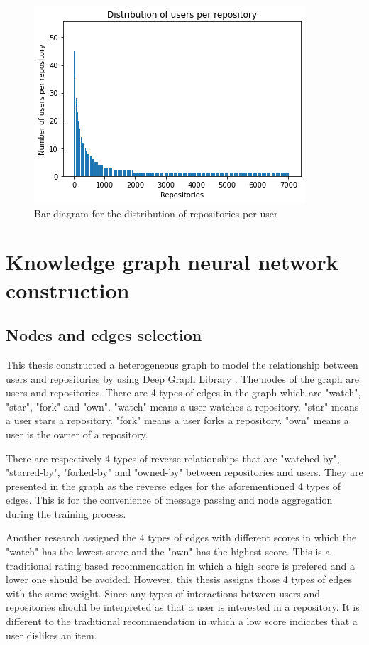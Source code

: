 \documentclass[11pt,twoside]{report}
\begin{document}
\begin{figure}[H]
    \centering
    \includegraphics[scale=0.9]{user_repo_dist_bar.png}
    \caption{Bar diagram for the distribution of repositories per user}
    \label{fig:user_repo_dist_bar}
\end{figure}

\section{Knowledge graph neural network construction}
\subsection{Nodes and edges selection}
This thesis constructed a heterogeneous graph to model the relationship between users and repositories by using Deep Graph Library \cite{wang2019dgl}. The nodes of the graph are users and repositories. There are 4 types of edges in the graph which are "watch", "star", "fork" and "own". "watch" means a user watches a repository. "star" means a user stars a repository. "fork" means a user forks a repository. "own" means a user is the owner of a repository. 

There are respectively 4 types of reverse relationships that are "watched-by", "starred-by", "forked-by" and "owned-by" between repositories and users. They are presented in the graph as the reverse edges for the aforementioned 4 types of edges. This is for the convenience of message passing and node aggregation during the training process.

Another research \cite{sun_personalized_2018} assigned the 4 types of edges with different scores in which the "watch" has the lowest score and the "own" has the highest score. This is a traditional rating based recommendation in which a high score is prefered and a lower one should be avoided. However, this thesis assigns those 4 types of edges with the same weight. Since any types of interactions between users and repositories should be interpreted as that a user is interested in a repository. It is different to the traditional recommendation in which a low score indicates that a user dislikes an item.
\end{document}
